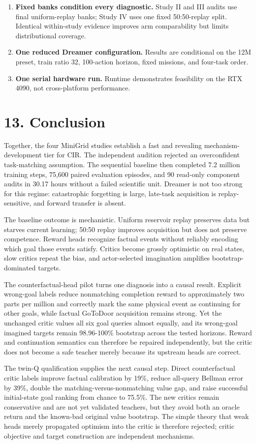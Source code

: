 \documentclass[10pt,a4paper]{article}
\newcommand{\reportsection}[1]{\section{#1}}
\begin{document}
\begin{enumerate}
\item \textbf{Fixed banks condition every diagnostic.} Study II and III audits use final uniform-replay banks; Study IV uses one fixed 50:50-replay split. Identical within-study evidence improves arm comparability but limits distributional coverage.
\item \textbf{One reduced Dreamer configuration.} Results are conditional on the 12M preset, train ratio 32, 100-action horizon, fixed missions, and four-task order.
\item \textbf{One serial hardware run.} Runtime demonstrates feasibility on the RTX 4090, not cross-platform performance.
\end{enumerate}
\reportsection{13. Conclusion}
Together, the four MiniGrid studies establish a fast and revealing mechanism-development tier for CIR. The independent audition rejected an overconfident task-matching assumption. The sequential baseline then completed 7.2 million training steps, 75,600 paired evaluation episodes, and 90 read-only component audits in 30.17 hours without a failed scientific unit. Dreamer is not too strong for this regime: catastrophic forgetting is large, late-task acquisition is replay-sensitive, and forward transfer is absent.

The baseline outcome is mechanistic. Uniform reservoir replay preserves data but starves current learning; 50:50 replay improves acquisition but does not preserve competence. Reward heads recognize factual events without reliably encoding which goal those events satisfy. Critics become grossly optimistic on real states, slow critics repeat the bias, and actor-selected imagination amplifies bootstrap-dominated targets.

The counterfactual-head pilot turns one diagnosis into a causal result. Explicit wrong-goal labels reduce nonmatching completion reward to approximately two parts per million and correctly mark the same physical event as continuing for other goals, while factual GoToDoor acquisition remains strong. Yet the unchanged critic values all six goal queries almost equally, and its wrong-goal imagined targets remain 98.96-100\% bootstrap across the tested horizons. Reward and continuation semantics can therefore be repaired independently, but the critic does not become a safe teacher merely because its upstream heads are correct.

The twin-Q qualification supplies the next causal step. Direct counterfactual critic labels improve factual calibration by 19\%, reduce all-query Bellman error by 39\%, double the matching-versus-nonmatching value gap, and raise successful initial-state goal ranking from chance to 75.5\%. The new critics remain conservative and are not yet validated teachers, but they avoid both an oracle return and the known-bad original value bootstrap. The simple theory that weak heads merely propagated optimism into the critic is therefore rejected; critic objective and target construction are independent mechanisms.
\end{document}
